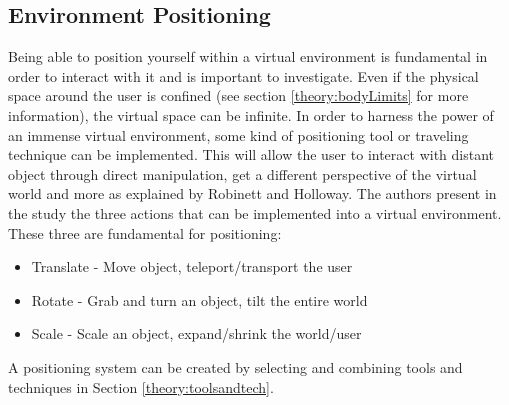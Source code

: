 \subsection{Environment Positioning}
Being able to position yourself within a virtual environment is fundamental in order to interact with it and is important to investigate.\cite{tools:warren2014perception} Even if the physical space around the user is confined (see section \ref{theory:bodyLimits} for more information), the virtual space can be infinite. In order to harness the power of an immense virtual environment, some kind of positioning tool or traveling technique can be implemented. This will allow the user to interact with distant object through direct manipulation, get a different perspective of the virtual world and more as explained by Robinett and Holloway. \cite{positioning:Robinett1992} The authors present in the study the three actions that can be implemented into a virtual environment. These three are fundamental for positioning:
\begin{itemize}
  \item Translate - Move object, teleport/transport the user
  \item Rotate - Grab and turn an object, tilt the entire world
  \item Scale - Scale an object, expand/shrink the world/user
\end{itemize}

A positioning system can be created by selecting and combining tools and techniques in Section \ref{theory:toolsandtech}.
